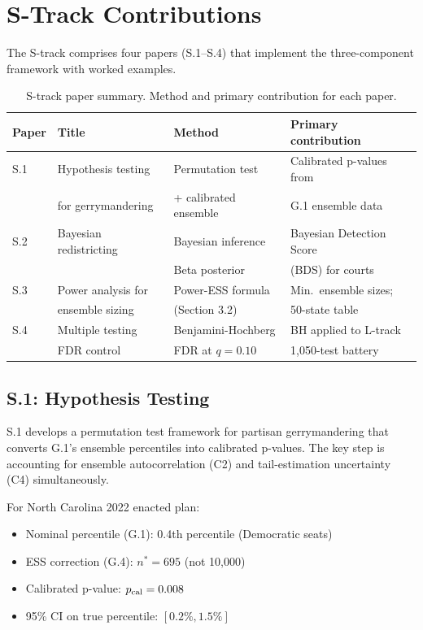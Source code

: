 \section{S-Track Contributions}
\label{sec:track}

The S-track comprises four papers (S.1--S.4) that implement the
three-component framework with worked examples.

\begin{table}[h]
\centering
\caption{S-track paper summary. Method and primary contribution for each paper.}
\label{tab:track-overview}
\begin{tabular}{llll}
\toprule
Paper & Title & Method & Primary contribution \\
\midrule
S.1 & Hypothesis testing & Permutation test & Calibrated p-values from \\
    & for gerrymandering & + calibrated ensemble & G.1 ensemble data \\
\midrule
S.2 & Bayesian redistricting & Bayesian inference & Bayesian Detection Score \\
    &                        & Beta posterior & (BDS) for courts \\
\midrule
S.3 & Power analysis for & Power-ESS formula & Min.\ ensemble sizes; \\
    & ensemble sizing & (Section 3.2) & 50-state table \\
\midrule
S.4 & Multiple testing & Benjamini-Hochberg & BH applied to L-track \\
    & FDR control & FDR at $q = 0.10$ & 1,050-test battery \\
\bottomrule
\end{tabular}
\end{table}

\subsection{S.1: Hypothesis Testing}

S.1 develops a permutation test framework for partisan gerrymandering
that converts G.1's ensemble percentiles into calibrated p-values.
The key step is accounting for ensemble autocorrelation (C2) and
tail-estimation uncertainty (C4) simultaneously.

For North Carolina 2022 enacted plan:
\begin{itemize}
\item Nominal percentile (G.1): 0.4th percentile (Democratic seats)
\item ESS correction (G.4): $n^* = 695$ (not 10,000)
\item Calibrated p-value: $p_{\rm cal} = 0.008$
\item 95\% CI on true percentile: $[0.2\%, 1.5\%]$
\end{itemize}

